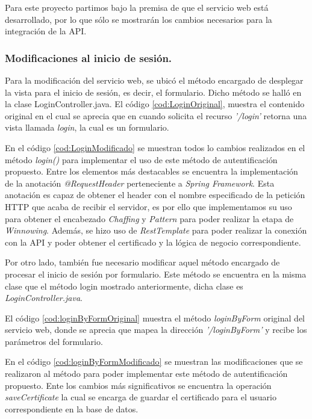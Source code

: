 \documentclass[12pt, a4paper, titlepage]{report}
\begin{document}
	            Para este proyecto partimos bajo la premisa de que el servicio web está desarrollado, por lo que sólo se mostrarán los cambios necesarios para la integración de la API.
	            
	            \subsubsection{Modificaciones al inicio de sesión.}
	                Para la modificación del servicio web, se ubicó el método encargado de desplegar la vista para el inicio de sesión, es decir, el formulario. Dicho método se halló en la clase LoginController.java. El código \ref{cod:LoginOriginal}, muestra el contenido original en el cual se aprecia que en cuando solicita el recurso \textit{'/login'} retorna una vista llamada \textit{login}, la cual es un formulario.
	                
	                
	                En el código \ref{cod:LoginModificado} se muestran todos lo cambios realizados en el método \textit{login()} para implementar el uso de este método de autentificación propuesto. Entre los elementos más destacables se encuentra la implementación de la anotación \textit{@RequestHeader} perteneciente a \textit{Spring Framework}. Esta anotación es capaz de obtener el header con el nombre especificado de la petición HTTP que acaba de recibir el servidor, es por ello que implementamos su uso para obtener el encabezado \textit{Chaffing} y \textit{Pattern} para poder realizar la etapa de \textit{Winnowing}. Además, se hizo uso de \textit{RestTemplate} para poder realizar la conexión con la API y poder obtener el certificado y la lógica de negocio correspondiente.
	                
	                
	                Por otro lado, también fue necesario modificar aquel método encargado de procesar el inicio de sesión por formulario. Este método se encuentra en la misma clase que el método login mostrado anteriormente, dicha clase es \textit{LoginController.java}. 
	                
	                El código \ref{cod:loginByFormOriginal} muestra el método \textit{loginByForm} original del servicio web, donde se aprecia que mapea la dirección \textit{'/loginByForm'} y recibe los parámetros del formulario.
	                
	                
	                En el código \ref{cod:loginByFormModificado} se muestran las modificaciones que se realizaron al método para poder implementar este método de autentificación propuesto. Ente los cambios más significativos se encuentra la operación \textit{saveCertificate} la cual se encarga de guardar el certificado para el usuario correspondiente en la base de datos.
	                
\end{document}
